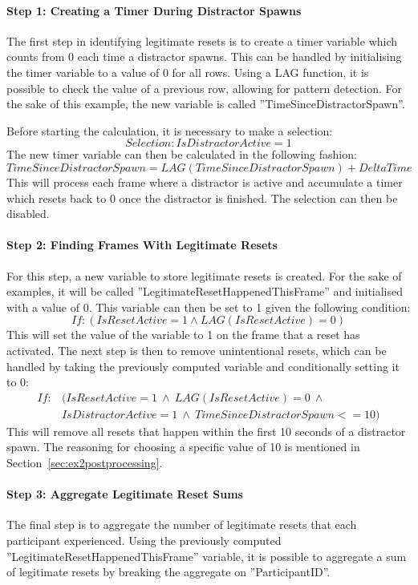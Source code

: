 \paragraph{Step 1: Creating a Timer During Distractor Spawns}
The first step in identifying legitimate resets is to create a timer variable which counts from 0 each time a distractor spawns. This can be handled by initialising the timer variable to a value of 0 for all rows. Using a LAG function, it is possible to check the value of a previous row, allowing for pattern detection. For the sake of this example, the new variable is called ''TimeSinceDistractorSpawn''. 

Before starting the calculation, it is necessary to make a selection:
$$
Selection: IsDistractorActive = 1
$$
The new timer variable can then be calculated in the following fashion:
$$
TimeSinceDistractorSpawn = LAG(TimeSinceDistractorSpawn) + DeltaTime
$$
This will process each frame where a distractor is active and accumulate a timer which resets back to 0 once the distractor is finished. The selection can then be disabled.  

\paragraph{Step 2: Finding Frames With Legitimate Resets}
For this step, a new variable to store legitimate resets is created. For the sake of examples, it will be called ''LegitimateResetHappenedThisFrame'' and initialised with a value of 0. This variable can then be set to 1 given the following condition:
$$
If: (IsResetActive = 1 \land LAG(IsResetActive) = 0)
$$
This will set the value of the variable to 1 on the frame that a reset has activated. The next step is then to remove unintentional resets, which can be handled by taking the previously computed variable and conditionally setting it to 0:
\begin{align*}
If: & (IsResetActive = 1 \ \land \ LAG(IsResetActive) = 0 \ \land \nonumber \\ & IsDistractorActive = 1 \ \land \ TimeSinceDistractorSpawn <= 10) \nonumber
\end{align*}
This will remove all resets that happen within the first 10 seconds of a distractor spawn. The reasoning for choosing a specific value of 10 is mentioned in Section~\ref{sec:ex2postprocessing}.

\paragraph{Step 3: Aggregate Legitimate Reset Sums}
The final step is to aggregate the number of legitimate resets that each participant experienced. Using the previously computed ''LegitimateResetHappenedThisFrame'' variable, it is possible to aggregate a sum of legitimate resets by breaking the aggregate on ''ParticipantID''. 

